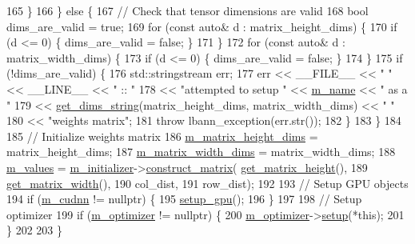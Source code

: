 \begin{DoxyCode}
165     \}
166   \} \textcolor{keywordflow}{else} \{
167     \textcolor{comment}{// Check that tensor dimensions are valid}
168     \textcolor{keywordtype}{bool} dims\_are\_valid = \textcolor{keyword}{true};
169     \textcolor{keywordflow}{for} (\textcolor{keyword}{const} \textcolor{keyword}{auto}& d : matrix\_height\_dims) \{
170       \textcolor{keywordflow}{if} (d <= 0) \{ dims\_are\_valid = \textcolor{keyword}{false}; \}
171     \}
172     \textcolor{keywordflow}{for} (\textcolor{keyword}{const} \textcolor{keyword}{auto}& d : matrix\_width\_dims) \{
173       \textcolor{keywordflow}{if} (d <= 0) \{ dims\_are\_valid = \textcolor{keyword}{false}; \}
174     \}
175     \textcolor{keywordflow}{if} (!dims\_are\_valid) \{
176       std::stringstream err;
177       err << \_\_FILE\_\_ << \textcolor{stringliteral}{" "} << \_\_LINE\_\_ << \textcolor{stringliteral}{" :: "}
178           << \textcolor{stringliteral}{"attempted to setup "} << \hyperlink{classlbann_1_1weights_a08abf0bb29aa47be21bfc7473b4b9b99}{m\_name} << \textcolor{stringliteral}{" as a "}
179           << \hyperlink{classlbann_1_1weights_ac15d39b1d887c8ff927b0c29f667e752}{get\_dims\_string}(matrix\_height\_dims, matrix\_width\_dims) << \textcolor{stringliteral}{" "}
180           << \textcolor{stringliteral}{"weights matrix"};
181       \textcolor{keywordflow}{throw} lbann\_exception(err.str());
182     \}
183   \}
184 
185   \textcolor{comment}{// Initialize weights matrix}
186   \hyperlink{classlbann_1_1weights_a9287dfbd8a7e4a9f5e0d6371d43ee92f}{m\_matrix\_height\_dims} = matrix\_height\_dims;
187   \hyperlink{classlbann_1_1weights_a8317a198bc5b4cd6bee2c806eefd1f12}{m\_matrix\_width\_dims} = matrix\_width\_dims;
188   \hyperlink{classlbann_1_1weights_a6b2df671b6d4c4dd595477971eea0543}{m\_values} = \hyperlink{classlbann_1_1weights_a3ddbcce8d543e975efeebdb43e82444c}{m\_initializer}->\hyperlink{classlbann_1_1weights__initializer_a693fd517e4162029eafdfdee537c7066}{construct\_matrix}(
      \hyperlink{classlbann_1_1weights_ad36676b9b43bced1cc7e332e3745411f}{get\_matrix\_height}(),
189                                              \hyperlink{classlbann_1_1weights_abc3cf3a5b992302b1eaaea1fdf3b377d}{get\_matrix\_width}(),
190                                              col\_dist,
191                                              row\_dist);
192 
193   \textcolor{comment}{// Setup GPU objects}
194   \textcolor{keywordflow}{if} (\hyperlink{classlbann_1_1weights_a873e8c14998915e442d03b8dd7d2fdf7}{m\_cudnn} != \textcolor{keyword}{nullptr}) \{
195     \hyperlink{classlbann_1_1weights_a7137725a835a37ded1a5ad7f739224a7}{setup\_gpu}();
196   \}
197 
198   \textcolor{comment}{// Setup optimizer}
199   \textcolor{keywordflow}{if} (\hyperlink{classlbann_1_1weights_a5f3b4d4a3ad390c2a9bdbe6c4971de65}{m\_optimizer} != \textcolor{keyword}{nullptr}) \{
200     \hyperlink{classlbann_1_1weights_a5f3b4d4a3ad390c2a9bdbe6c4971de65}{m\_optimizer}->\hyperlink{classlbann_1_1optimizer_a7641a88b3c166df2d974a298622b992b}{setup}(*\textcolor{keyword}{this});
201   \}
202 
203 \}
\end{DoxyCode}
